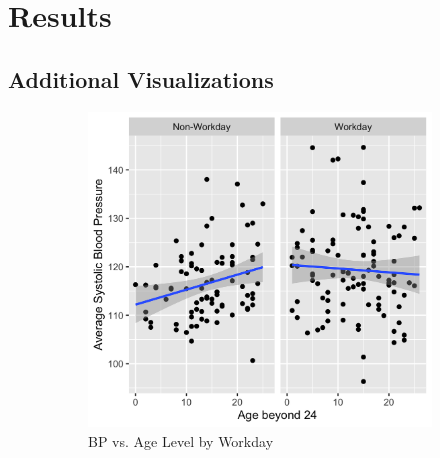 \documentclass[12pt,twoside,leqno,fleqn,letterpaper]{article}
\theoremstyle{definition}
\theoremstyle{definition}
\begin{document}
\section{Results}\label{sec: results}


\begin{appendices}
    \section{Additional Visualizations}\label{sec: add visuals}

    \begin{figure}[h] 
        \centering
        \begin{subfigure}[b]{0.3\textwidth}
        \centering
        \includegraphics[width=\textwidth]{pics/bp by age and day.png}
        \caption[]%
        {{\small BP vs. Age Level by Workday}}
        \label{fig: bp v age and day}
        \end{subfigure}
        \hfill
        \begin{subfigure}[b]{0.3\textwidth}
        \centering

\end{subfigure}
\end{figure}
\end{appendices}
\end{document}
